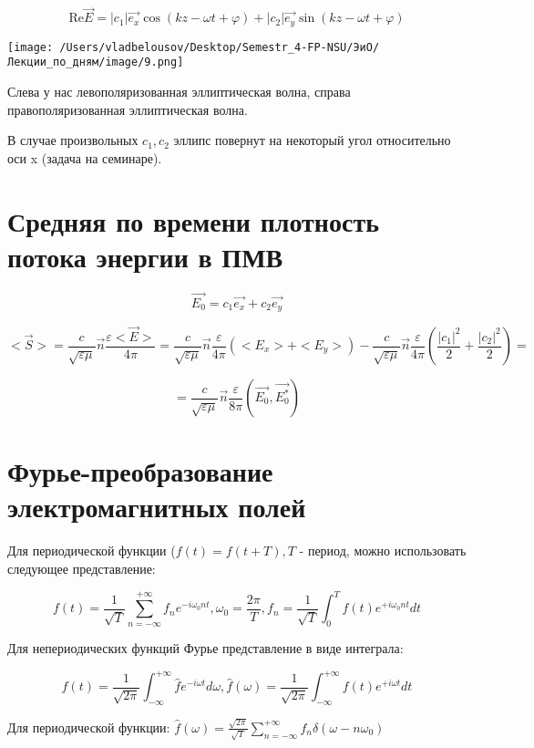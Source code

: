 \documentclass[12pt, a4paper]{report}
\begin{document}
\[ \mathrm{Re}\vec{E }= |c_1|\vec{e_x}\cos ( kz - \omega t + \varphi) + |c_2|\vec{e_y}\sin( kz - \omega t + \varphi)   \] 

\begin{center}
    \texttt{[image: /Users/vladbelousov/Desktop/Semestr\_4-FP-NSU/ЭиО/Лекции\_по\_дням/image/9.png]}
\end{center}

Слева у нас левополяризованная эллиптическая волна, справа правополяризованная эллиптическая волна.

В случае произвольных  \( c_1, c_2 \)  эллипс повернут на некоторый угол относительно оси x (задача на семинаре).

\section{Средняя по времени плотность  потока энергии в ПМВ}

\[ \vec{E_0}= c_1\vec{e_x}+ c_2 \vec{e_y} \] 

\[ <\vec{S}> = \frac{c}{\sqrt{\varepsilon \mu}} \vec{n} \frac{\varepsilon<\vec{E}>}{4 \pi} = \frac{c}{\sqrt{\varepsilon \mu}} \vec{n} \frac{\varepsilon}{4 \pi} (<E_x>+ <E_y> )-\frac{c}{\sqrt{\varepsilon \mu}}\vec{n} \frac{\varepsilon}{4 \pi}( \frac{|c_1| ^2}{2}+ \frac{|c_2| ^2}{2} )  =  \] 

\[ = \frac{c}{\sqrt{\varepsilon \mu}} \vec{n} \frac{\varepsilon}{8 \pi} ( \vec{E_0}, \vec{E_0^*} )  \] 

\section{Фурье-преобразование электромагнитных полей}

Для периодической функции (\( f(t)= f(t+T) ,T\) - период, можно использовать следующее представление: 

\[ f(t)= \frac{1}{\sqrt{T}} \sum_{n=- \infty }^{+ \infty }f_n e^{- i \omega_0 nt } , \omega_0 = \frac{2 \pi}{T}, f_n = \frac{1}{\sqrt{T}}  \int_{0}^{T}f(t)e^{+i \omega_0 nt} dt      \] 


Для непериодических функций Фурье представление в виде интеграла: 

\[ f(t)= \frac{1}{\sqrt{2 \pi}} \int_{-\infty }^{+\infty} \hat{f}e^{-i \omega t}d \omega, \hat{f}( \omega)= \frac{1}{\sqrt{2 \pi}} \int_{-\infty }^{+\infty}    f(t) e^{+i \omega t}dt     \] 

Для периодической функции: \( \hat{f}( \omega)= \frac{\sqrt{2\pi}}{\sqrt{T}} \sum ^{+\infty }_{n = - \infty } f_n \delta( \omega- n \omega_0)     \) 
\end{document}
